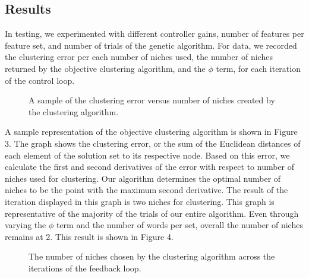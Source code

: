 \documentclass{sig-alternate}
\begin{document}
\subsection{Results}
In testing, we experimented with different controller gains, number of features per feature set, and number of trials of the genetic algorithm. For data, we recorded the clustering error per each number of niches used, the number of niches returned by the objective clustering algorithm, and the $\phi$ term, for each iteration of the control loop.
\begin{figure}[t]
\centering
{}
\caption{A sample of the clustering error versus number of niches created by the clustering algorithm.}
\label{fig:graph1}
\end{figure}
A sample representation of the objective clustering algorithm is shown in Figure 3. The graph shows the clustering error, or the sum of the Euclidean distances of each element of the solution set to its respective node. Based on this error, we calculate the first and second derivatives of the error with respect to number of niches used for clustering. Our algorithm determines the optimal number of niches to be the point with the maximum second derivative. The result of the iteration displayed in this graph is two niches for clustering. This graph is representative of the majority of the trials of our entire algorithm. Even through varying the $\phi$ term and the number of words per set, overall the number of niches remains at 2. This result is shown in Figure 4.
\begin{figure}[t]
\centering
{}
\caption{The number of niches chosen by the clustering algorithm across the iterations of the feedback loop.}
\label{fig:graph2}
\end{figure}
\end{document}
